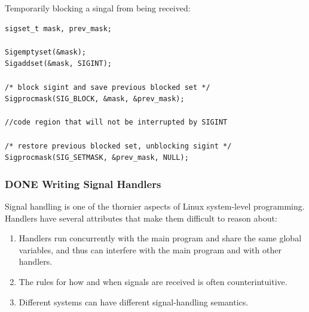 \documentclass[11pt]{article}
\begin{document}
Temporarily blocking a singal from being received:\\
\begin{verbatim}
sigset_t mask, prev_mask;

Sigemptyset(&mask);
Sigaddset(&mask, SIGINT);

/* block sigint and save previous blocked set */
Sigprocmask(SIG_BLOCK, &mask, &prev_mask);

//code region that will not be interrupted by SIGINT

/* restore previous blocked set, unblocking sigint */
Sigprocmask(SIG_SETMASK, &prev_mask, NULL);
\end{verbatim}


\subsubsection{{\bfseries\sffamily DONE} Writing Signal Handlers}
\label{sec:org76c2a0b}
Signal handling is one of the thornier aspects of Linux system-level programming. Handlers have several attributes that make them difficult to reason about:\\
\begin{enumerate}
\item Handlers run concurrently with the main program and share the same global variables, and thus can interfere with the main program and with other handlers.\\
\item The rules for how and when signals are received is often counterintuitive.\\
\item Different systems can have different signal-handling semantics.\\
\end{enumerate}
\end{document}
